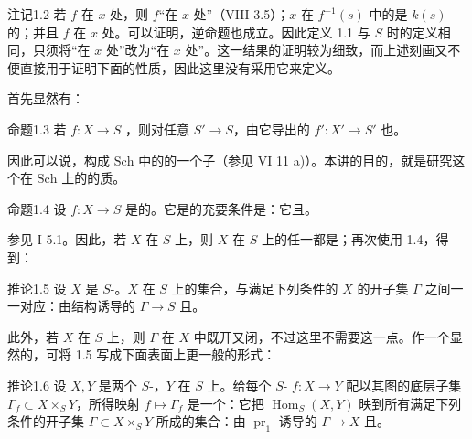\begin{SGAresult}{注记}{1.2}
若 $f$ 在 $x$ 处，则 $f$“在 $x$ 处”（VIII 3.5）；$x$ 在 $f^{-1}(s)$ 中的是 $k(s)$ 的；并且 $f$ 在 $x$ 处。可以证明，逆命题也成立。因此定义 1.1 与 $S$  时的定义相同，只须将“在 $x$ 处”改为“在 $x$ 处”。这一结果的证明较为细致，而上述刻画又不便直接用于证明下面的性质，因此这里没有采用它来定义。
\end{SGAresult}
首先显然有：
\begin{SGAresult}{命题}{1.3}
若 $f:X\to S$ ，则对任意 $S'\to S$，由它导出的 $f':X'\to S'$ 也。
\end{SGAresult}
因此可以说，构成 $\mathrm{Sch}$ 中的的一个子（参见 VI 11 a)）。本讲的目的，就是研究这个在 $\mathrm{Sch}$ 上的的质。
\begin{SGAresult}{命题}{1.4}
设 $f:X\to S$ 是的。它是的充要条件是：它且。
\end{SGAresult}
参见 I 5.1。因此，若 $X$ 在 $S$ 上，则 $X$ 在 $S$ 上的任一都是；再次使用 1.4，得到：
\begin{SGAresult}{推论}{1.5}
设 $X$ 是 $S$-。$X$ 在 $S$ 上的集合，与满足下列条件的 $X$ 的开子集 $\Gamma$ 之间一一对应：由结构诱导的 $\Gamma\to S$ 且。
\end{SGAresult}
此外，若 $X$ 在 $S$ 上，则 $\Gamma$ 在 $X$ 中既开又闭，不过这里不需要这一点。作一个显然的，可将 1.5 写成下面表面上更一般的形式：
\begin{SGAresult}{推论}{1.6}
设 $X,Y$ 是两个 $S$-，$Y$ 在 $S$ 上。给每个 $S$- $f:X\to Y$ 配以其图的底层子集 $\Gamma_f\subset X\times_S Y$，所得映射 $f\mapsto\Gamma_f$ 是一个：它把 $\operatorname{Hom}_S(X,Y)$ 映到所有满足下列条件的开子集 $\Gamma\subset X\times_S Y$ 所成的集合：由 $\operatorname{pr}_1$ 诱导的 $\Gamma\to X$ 且。
\end{SGAresult}
